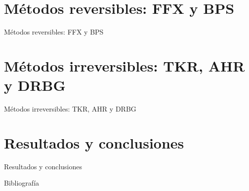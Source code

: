 \documentclass{beamer}
\begin{document}
  \section{Métodos reversibles: FFX y BPS}

  \begin{frame}{Métodos reversibles: FFX y BPS}

  \end{frame}

  \section{Métodos irreversibles: TKR, AHR y DRBG}

  \begin{frame}{Métodos irreversibles: TKR, AHR y DRBG}

  \end{frame}

  \section{Resultados y conclusiones}

  \begin{frame}{Resultados y conclusiones}

  \end{frame}

  \begin{frame}[allowframebreaks]{Bibliografía}
    \printbibliography
  \end{frame}

  \setlength{\parskip}{0.0em}

  {
  \frame{\titlepage}}
\end{document}
